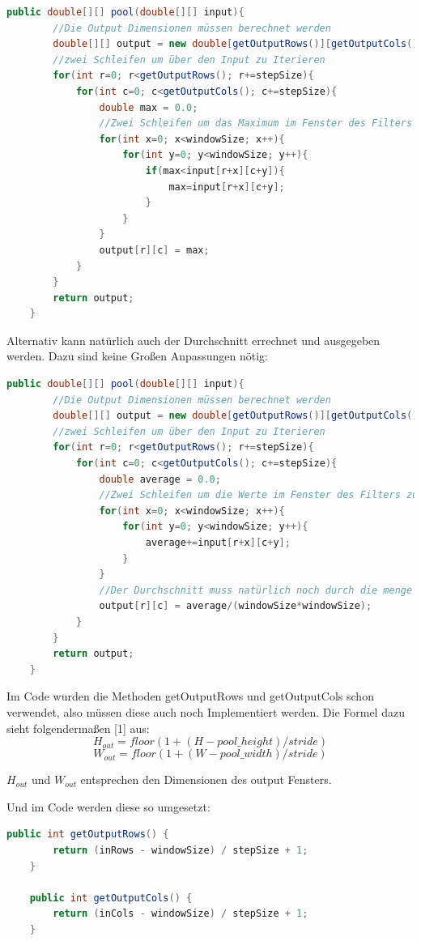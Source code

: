 \documentclass[12pt]{article}
\begin{document}
\begin{lstlisting}[language=Java]
 public double[][] pool(double[][] input){
 		//Die Output Dimensionen müssen berechnet werden
        double[][] output = new double[getOutputRows()][getOutputCols()];
        //zwei Schleifen um über den Input zu Iterieren
        for(int r=0; r<getOutputRows(); r+=stepSize){
            for(int c=0; c<getOutputCols(); c+=stepSize){
                double max = 0.0;
                //Zwei Schleifen um das Maximum im Fenster des Filters zu finden
                for(int x=0; x<windowSize; x++){
                    for(int y=0; y<windowSize; y++){
                        if(max<input[r+x][c+y]){
                            max=input[r+x][c+y];
                        }
                    }
                }
                output[r][c] = max;
            }
        }
        return output;
    }
\end{lstlisting}
Alternativ kann natürlich auch der Durchschnitt errechnet und ausgegeben werden. Dazu sind keine Großen Anpassungen nötig:
\begin{lstlisting}[language=Java]
 public double[][] pool(double[][] input){
 		//Die Output Dimensionen müssen berechnet werden
        double[][] output = new double[getOutputRows()][getOutputCols()];
        //zwei Schleifen um über den Input zu Iterieren
        for(int r=0; r<getOutputRows(); r+=stepSize){
            for(int c=0; c<getOutputCols(); c+=stepSize){
                double average = 0.0;
                //Zwei Schleifen um die Werte im Fenster des Filters zu addieren
                for(int x=0; x<windowSize; x++){
                    for(int y=0; y<windowSize; y++){
                    	average+=input[r+x][c+y];
                    }
                }
                //Der Durchschnitt muss natürlich noch durch die menge der im Filter Fenster enthaltenen Pixel geteilt werden
                output[r][c] = average/(windowSize*windowSize);
            }
        }
        return output;
    }
\end{lstlisting}
Im Code wurden die Methoden getOutputRows und getOutputCols schon verwendet, also müssen diese auch noch Implementiert werden. Die Formel dazu sieht folgendermaßen [1] aus:
$$H_{out} = floor(1 + (H - pool\_height)/stride)$$
$$W_{out} = floor(1 + (W - pool\_ width)/stride)$$

$H_{out}$ und $W_{out}$ entsprechen den Dimensionen des output Fensters. 

Und im Code werden diese so umgesetzt:

\begin{lstlisting}[language=Java]
    public int getOutputRows() {
        return (inRows - windowSize) / stepSize + 1;
    }

    public int getOutputCols() {
        return (inCols - windowSize) / stepSize + 1;
    }
\end{lstlisting}
\end{document}
